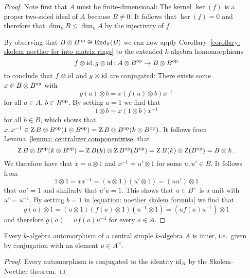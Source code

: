 \begin{proof}
  Note first that $A$ must be finite-dimensional:
  The kernel $\ker(f)$ is a proper two-sided ideal of $A$ because $B \neq 0$.
  It follows that $\ker(f) = 0$ and therefore that $\dim_k B \leq \dim_k A$ by the injectivity of $f$
  
  By observing that $B \otimes B^{\mathrm{op}} \cong \operatorname{End}_k(B)$ we can now apply Corollary~\ref{corollary: skolem noether for into matrix rings} to the extended $k$-algebra homomorphisms
  \[
            f \otimes \operatorname{id}, g \otimes \operatorname{id}
    \colon  A \otimes B^{\mathrm{op}}
    \to     B \otimes B^{\mathrm{op}}
  \]
  to conclude that $f \otimes \operatorname{id}$ and $g \otimes \operatorname{id}$ are conjugated:
  There exists some $x \in B \otimes B^{\mathrm{op}}$ with
  \begin{equation}
    \label{equation: noether skolem formula}
      g(a) \otimes b
    = x ( f(a) \otimes b ) x^{-1}
  \end{equation}
  for all $a \in A$, $b \in B^{\mathrm{op}}$.
  By setting $a = 1$ we find that
  \[
      1 \otimes b
    = x (1 \otimes b) x^{-1}
  \]
  for all $b \in B$, which shows that $x, x^{-1} \in \operatorname{Z}{B \otimes B^{\mathrm{op}}}(1 \otimes B^{\mathrm{op}}) = \operatorname{Z}{B \otimes B^{\mathrm{op}}}(k \otimes B^{\mathrm{op}})$.
  It follows from Lemma~\ref{lemma: centralizer componentwise} that
  \[
      \operatorname{Z}{B \otimes B^{\mathrm{op}}}(k \otimes B^{\mathrm{op}})
    = \operatorname{Z}{B}(k) \otimes \operatorname{Z}{B^{\mathrm{op}}}(B^{\mathrm{op}})
    = \operatorname{Z}{B}(k) \otimes \operatorname{Z}(B^{\mathrm{op}})
    = B \otimes k \,.
  \]
  We therefore have that $x = u \otimes 1$ and $x^{-1} = u' \otimes 1$ for some $u, u' \in B$.
  It follows from
  \[
      1 \otimes 1
    = x x^{-1}
    = (u \otimes 1) (u' \otimes 1)
    = (u u') \otimes 1
  \]
  that $u u' = 1$ and similarly that $u' u = 1$.
  This shows that $u \in B^\times$ is a unit with $u' = u^{-1}$.
  By setting $b = 1$ in \eqref{equation: noether skolem formula} we find that
  \[
      g(a) \otimes 1
    = (u \otimes 1) (f(a) \otimes 1) (u^{-1} \otimes 1)
    = (u f(a) u^{-1}) \otimes 1
  \]
  and therefore $g(a) = u f(a) u^{-1}$ for every $a \in A$.
\end{proof}


\begin{corollary}
  Every $k$-algebra automorphism of a central simple $k$-algebra $A$ is inner, i.e.\ given by conjugation with an element $u \in A^\times$.
\end{corollary}


\begin{proof}
  Every automorphism is conjugated to the identity $\operatorname{id}_A$ by the Skolem--Noether theorem.
\end{proof}
